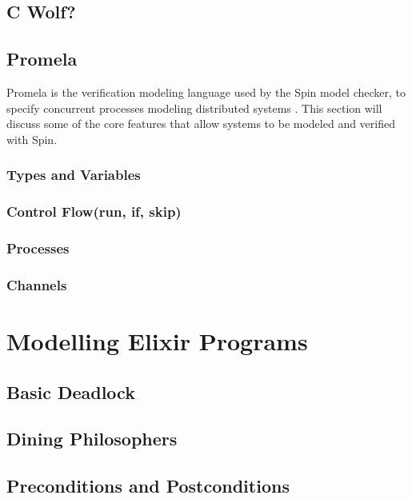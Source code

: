 \subsection[]{C Wolf?}
\subsection[]{Promela} \label{sec:promela}
Promela is the verification modeling language used by the Spin model checker, to specify concurrent processes modeling distributed systems \cite{spin}. This section will discuss some of the core features that allow systems to be modeled and verified with Spin.  
\subsubsection[]{Types and Variables}
\subsubsection[]{Control Flow(run, if, skip)}
\subsubsection[]{Processes}
\subsubsection[]{Channels}
\section[]{Modelling Elixir Programs}
\subsection[]{Basic Deadlock}
\subsection[]{Dining Philosophers}
\subsection[]{Preconditions and Postconditions}
